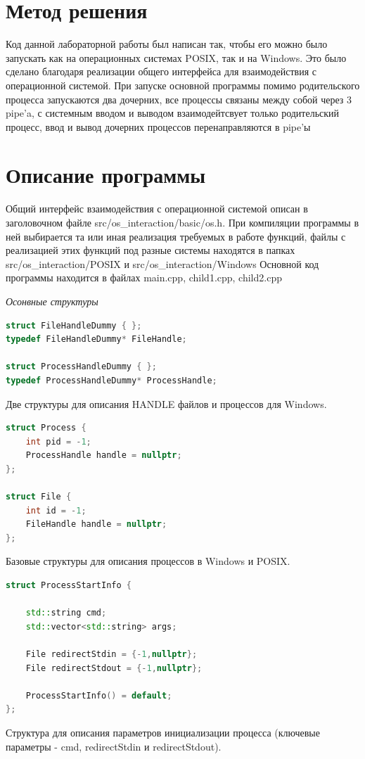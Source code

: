 \section{Метод решения}
Код данной лабораторной работы был написан так, чтобы его можно было запускать как на операционных системах POSIX, так и на Windows.
Это было сделано благодаря реализации общего интерфейса для взаимодействия с операционной системой.
При запуске основной программы помимо родительского процесса запускаются два дочерних, все процессы связаны между собой через 3 pipe'a, с системным вводом и выводом взаимодейтсвует только родительский процесс, ввод и вывод дочерних процессов перенаправляются в pipe'ы

\section{Описание программы}
Общий интерфейс взаимодействия с операционной системой описан в заголовочном файле src/os\_interaction/basic/os.h.
При компиляции программы в ней выбирается та или иная реализация требуемых в работе функций, файлы с реализацией этих функций под разные системы находятся в папках src/os\_interaction/POSIX и src/os\_interaction/Windows
Основной код программы находится в файлах main.cpp, child1.cpp, child2.cpp

\textit{Осонвные структуры}
\begin{lstlisting}[language=C++]
struct FileHandleDummy { };
typedef FileHandleDummy* FileHandle;

struct ProcessHandleDummy { };
typedef ProcessHandleDummy* ProcessHandle;
\end{lstlisting}
Две структуры для описания HANDLE файлов и процессов для Windows.

\begin{lstlisting}[language=C++]
struct Process {
    int pid = -1;
    ProcessHandle handle = nullptr;
};

struct File {
    int id = -1;
    FileHandle handle = nullptr;
};
\end{lstlisting}
Базовые структуры для описания процессов в Windows и POSIX.

\begin{lstlisting}[language=C++]
struct ProcessStartInfo {

    std::string cmd;
    std::vector<std::string> args;

    File redirectStdin = {-1,nullptr};
    File redirectStdout = {-1,nullptr};

    ProcessStartInfo() = default;
};
\end{lstlisting}
Структура для описания параметров инициализации процесса (ключевые параметры - cmd, redirectStdin и redirectStdout).

